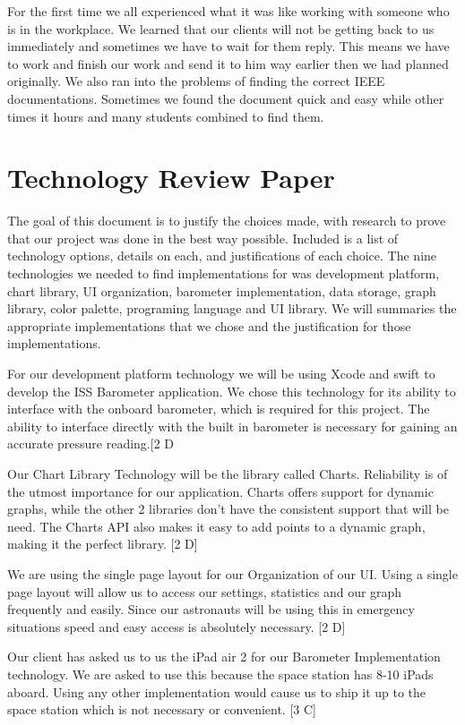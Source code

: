 \documentclass[onecolumn, draftclsnofoot,10pt, compsoc]{IEEEtran}
\begin{document}
For the first time we all experienced what it was like working with someone who is in the workplace.
We learned that our clients will not be getting back to us immediately and sometimes we have to wait for them reply.
This means we have to work and finish our work and send it to him way earlier then we had planned originally. 
We also ran into the problems of finding the correct IEEE documentations. 
Sometimes we found the document quick and easy while other times it hours and many students combined to find them.  

\section{Technology Review Paper}

The goal of this document is to justify the choices made, with research to prove that our project was done in the best way possible. 
Included is a list of technology options, details on each, and justifications of each choice. 
The nine technologies we needed to find implementations  for was development platform, chart library, UI organization, barometer implementation, data storage, graph library, color palette, programing language and UI library. 
We will summaries the appropriate implementations that we chose and the justification for those implementations. 

For our development platform technology we will be using Xcode and swift to develop the ISS Barometer application.
We chose this technology for its ability to interface with the onboard barometer, which is required for this project.
The ability to interface directly with the built in barometer is necessary for gaining an accurate pressure reading.[2 D


Our Chart Library Technology will be the library called Charts.
Reliability is of the utmost importance for our application. 
Charts offers support for dynamic graphs, while the other 2 libraries don't have the consistent support that will be need.
The Charts API also makes it easy to add points to a dynamic graph, making it the perfect library. [2 D]

We are using the single page layout for our Organization of our UI. 
Using a single page layout will allow us to access our settings, statistics and our graph frequently and easily.
Since our astronauts will be using this in emergency situations speed and easy access is absolutely necessary.  [2 D]

Our client has asked us to us the iPad air 2 for our Barometer Implementation technology.
We are asked to use this because the space station has 8-10 iPads aboard. 
Using any other implementation would cause us to ship it up to the space station which is not necessary or convenient. [3 C]
\end{document}
